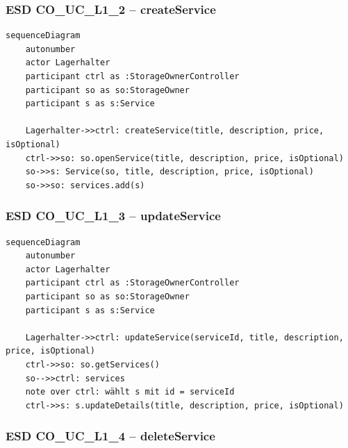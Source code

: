 \subsubsection*{ESD CO\_UC\_L1\_2 – createService}

\begin{lstlisting}[basicstyle=\ttfamily\small, breaklines=true]
sequenceDiagram
    autonumber
    actor Lagerhalter
    participant ctrl as :StorageOwnerController
    participant so as so:StorageOwner
    participant s as s:Service

    Lagerhalter->>ctrl: createService(title, description, price, isOptional)
    ctrl->>so: so.openService(title, description, price, isOptional)
    so->>s: Service(so, title, description, price, isOptional)
    so->>so: services.add(s)
\end{lstlisting}

\newpage

{}
\subsubsection*{ESD CO\_UC\_L1\_3 – updateService}

\begin{lstlisting}[basicstyle=\ttfamily\small, breaklines=true]
sequenceDiagram
    autonumber
    actor Lagerhalter
    participant ctrl as :StorageOwnerController
    participant so as so:StorageOwner
    participant s as s:Service

    Lagerhalter->>ctrl: updateService(serviceId, title, description, price, isOptional)
    ctrl->>so: so.getServices()
    so-->>ctrl: services
    note over ctrl: wählt s mit id = serviceId
    ctrl->>s: s.updateDetails(title, description, price, isOptional)
\end{lstlisting}

\newpage

{}
\subsubsection*{ESD CO\_UC\_L1\_4 – deleteService}

